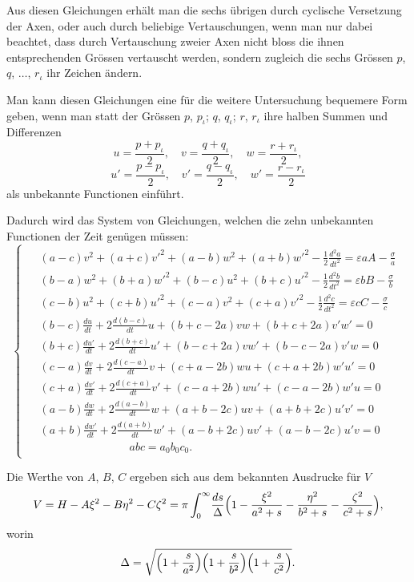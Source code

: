 \documentclass[12pt,a4paper]{article}
\begin{document}
Aus diesen Gleichungen erhält man die sechs übrigen durch cyclische Versetzung der Axen, oder auch durch beliebige Vertauschungen, wenn man nur dabei beachtet, dass durch Vertauschung zweier Axen nicht bloss die ihnen entsprechenden Grössen vertauscht werden, sondern zugleich die sechs Grössen $p$, $q$, $\ldots$, $r_\iota$ ihr Zeichen ändern.

Man kann diesen Gleichungen eine für die weitere Untersuchung bequemere Form geben, wenn man statt der Grössen $p$, $p_\iota$; $q$, $q_\iota$; $r$, $r_\iota$ ihre halben Summen und Differenzen
\[
u = \frac{p+p_\iota}{2},\quad v = \frac{q+q_\iota}{2},\quad w = \frac{r+r_\iota}{2},
\]
\[
u' = \frac{p-p_\iota}{2},\quad v' = \frac{q-q_\iota}{2},\quad w' = \frac{r-r_\iota}{2}
\]
als unbekannte Functionen einführt.

Dadurch wird das System von Gleichungen, welchen die zehn unbekannten Functionen der Zeit genügen müssen:
\begin{equation}
\tag{$\alpha$}
\begin{cases}
\begin{aligned}
&(a-c)v^2 + (a+c)v'^2 + (a-b)w^2 + (a+b)w'^2 - \tfrac{1}{2}\frac{d^2a}{dt^2} = \varepsilon aA - \frac{\sigma}{a}\\
&(b-a)w^2 + (b+a)w'^2 + (b-c)u^2 + (b+c)u'^2 - \tfrac{1}{2}\frac{d^2b}{dt^2} = \varepsilon bB - \frac{\sigma}{b}\\
&(c-b)u^2 + (c+b)u'^2 + (c-a)v^2 + (c+a)v'^2 - \tfrac{1}{2}\frac{d^2c}{dt^2} = \varepsilon cC - \frac{\sigma}{c}\\
&(b-c)\frac{du}{dt} + 2\frac{d(b-c)}{dt}u + (b+c-2a)vw + (b+c+2a)v'w' = 0\\
&(b+c)\frac{du'}{dt} + 2\frac{d(b+c)}{dt}u' + (b-c+2a)vw' + (b-c-2a)v'w = 0\\
&(c-a)\frac{dv}{dt} + 2\frac{d(c-a)}{dt}v + (c+a-2b)wu + (c+a+2b)w'u' = 0\\
&(c+a)\frac{dv'}{dt} + 2\frac{d(c+a)}{dt}v' + (c-a+2b)wu' + (c-a-2b)w'u = 0\\
&(a-b)\frac{dw}{dt} + 2\frac{d(a-b)}{dt}w + (a+b-2c)uv + (a+b+2c)u'v' = 0\\
&(a+b)\frac{dw'}{dt} + 2\frac{d(a+b)}{dt}w' + (a-b+2c)uv' + (a-b-2c)u'v = 0\\
&\qquad\qquad\qquad\qquad abc = a_0b_0c_0.
\end{aligned}
\end{cases}
\end{equation}

Die Werthe von $A$, $B$, $C$ ergeben sich aus dem bekannten Ausdrucke für $V$
\[
V = H - A\xi^2 - B\eta^2 - C\zeta^2 = \pi\int_0^{\infty}\!\frac{ds}{\Delta}\Bigl(1 - \frac{\xi^2}{a^2+s} - \frac{\eta^2}{b^2+s} - \frac{\zeta^2}{c^2+s}\Bigr),
\]
worin
\[
\Delta = \sqrt{\Bigl(1+\frac{s}{a^2}\Bigr)\Bigl(1+\frac{s}{b^2}\Bigr)\Bigl(1+\frac{s}{c^2}\Bigr)}.
\]
\end{document}
